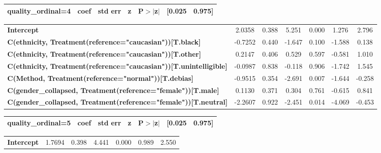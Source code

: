 \begin{center}
\begin{tabular}{lcccccc}
\bottomrule
\end{tabular}
\begin{tabular}{ccccccc}
                       \textbf{quality\_ordinal=4}                        & \textbf{coef} & \textbf{std err} & \textbf{z} & \textbf{P$> |$z$|$} & \textbf{[0.025} & \textbf{0.975]}  \\
\midrule
\bottomrule
\end{tabular}
\begin{tabular}{lcccccc}
\textbf{Intercept}                                                        &       2.0358  &        0.388     &     5.251  &         0.000        &        1.276    &        2.796     \\
\textbf{C(ethnicity, Treatment(reference="caucasian"))[T.black]}          &      -0.7252  &        0.440     &    -1.647  &         0.100        &       -1.588    &        0.138     \\
\textbf{C(ethnicity, Treatment(reference="caucasian"))[T.other]}          &       0.2147  &        0.406     &     0.529  &         0.597        &       -0.581    &        1.010     \\
\textbf{C(ethnicity, Treatment(reference="caucasian"))[T.unintelligible]} &      -0.0987  &        0.838     &    -0.118  &         0.906        &       -1.742    &        1.545     \\
\textbf{C(Method, Treatment(reference="normal"))[T.debias]}               &      -0.9515  &        0.354     &    -2.691  &         0.007        &       -1.644    &       -0.258     \\
\textbf{C(gender\_collapsed, Treatment(reference="female"))[T.male]}      &       0.1130  &        0.371     &     0.304  &         0.761        &       -0.615    &        0.841     \\
\textbf{C(gender\_collapsed, Treatment(reference="female"))[T.neutral]}   &      -2.2607  &        0.922     &    -2.451  &         0.014        &       -4.069    &       -0.453     \\
\bottomrule
\end{tabular}
\begin{tabular}{ccccccc}
                       \textbf{quality\_ordinal=5}                        & \textbf{coef} & \textbf{std err} & \textbf{z} & \textbf{P$> |$z$|$} & \textbf{[0.025} & \textbf{0.975]}  \\
\midrule
\bottomrule
\end{tabular}
\begin{tabular}{lcccccc}
\textbf{Intercept}                                                        &       1.7694  &        0.398     &     4.441  &         0.000        &        0.989    &        2.550     \\

\end{tabular}
\end{center}
